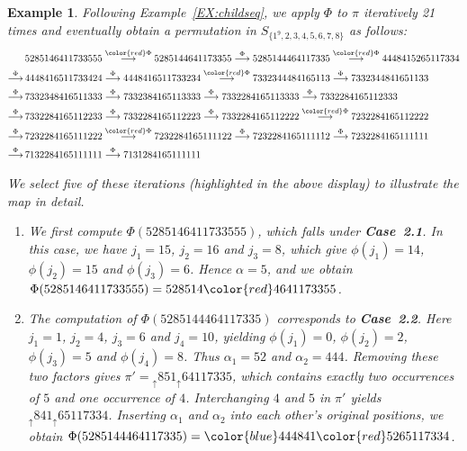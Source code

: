 \documentclass[11pt]{article}
\numberwithin{equation}{section}
\newtheorem{exa}[thm]{Example}
\newcommand{\cred}{\color{red}}
\newcommand{\cblue}{\color{blue}}
\begin{document}
\begin{exa}\label{EX:Phi}
	Following Example~\ref{EX:childseq}, we apply $\Phi$ to $\pi$ iteratively 21 times and eventually obtain a permutation in $S_{\{1^9,2,3,4,5,6,7,8\}}$ as follows:
	\begin{align*}
	&5285146411733555\stackrel{{\cred\Phi}}{\longrightarrow}5285144641173355\stackrel{\Phi}{\longrightarrow}5285144464117335\stackrel{{\cred\Phi}}{\longrightarrow}4448415265117334\\
	\stackrel{\Phi}{\longrightarrow}\,&4448416511733424\stackrel{\Phi}{\longrightarrow}4448416511733234\stackrel{{\cred\Phi}}{\longrightarrow}7332344484165113\stackrel{\Phi}{\longrightarrow}7332344841651133\\
	\stackrel{\Phi}{\longrightarrow}\,&7332348416511333\stackrel{\Phi}{\longrightarrow}7332384165113333\stackrel{\Phi}{\longrightarrow}7332284165113333\stackrel{\Phi}{\longrightarrow}7332284165112333\\
	\stackrel{\Phi}{\longrightarrow}\,&7332284165112233\stackrel{\Phi}{\longrightarrow}7332284165112223\stackrel{\Phi}{\longrightarrow}7332284165112222\stackrel{{\cred \Phi}}{\longrightarrow}7232284165112222\\
	\stackrel{\Phi}{\longrightarrow}\,&7232284165111222\stackrel{{\cred\Phi}}{\longrightarrow}7232284165111122\stackrel{\Phi}{\longrightarrow}7232284165111112\stackrel{\Phi}{\longrightarrow}7232284165111111\\
	\stackrel{\Phi}{\longrightarrow}\,&7132284165111111\stackrel{\Phi}{\longrightarrow}7131284165111111
	\end{align*}
	
	We select five of these iterations (highlighted in the above display) to illustrate the map in detail.
	
	\begin{enumerate}
		\item We first compute $\Phi(5285146411733555)$, which falls under {\bf Case~2.1}. In this case, we have $j_1=15$, $j_2=16$ and $j_3=8$, which give $\phi(j_1)=14$, $\phi(j_2)=15$ and $\phi(j_3)=6$. Hence $\alpha = 5$, and we obtain $\Phi(5285146411733555)=528514{\cred 4}641173355$.
		
		\item The computation of $\Phi(5285144464117335)$ corresponds to {\bf Case~2.2}. Here $j_1=1$, $j_2=4$, $j_3=6$ and $j_4=10$, yielding $\phi(j_1)=0$, $\phi(j_2)=2$, $\phi(j_3)=5$ and $\phi(j_4)=8$. Thus $\alpha_1=52$ and $\alpha_2=444$. Removing these two factors gives $\pi' = {}_{\uparrow}851_{\uparrow}64117335$, which contains exactly two occurrences of $5$ and one occurrence of $4$. Interchanging $4$ and $5$ in $\pi'$ yields $_{\uparrow}841_{\uparrow}65117334$. Inserting $\alpha_1$ and $\alpha_2$ into each other's original positions, we obtain $\Phi(5285144464117335)={\cblue 444}841{\cred 52}65117334$.
		

\end{enumerate}
\end{exa}
\end{document}
